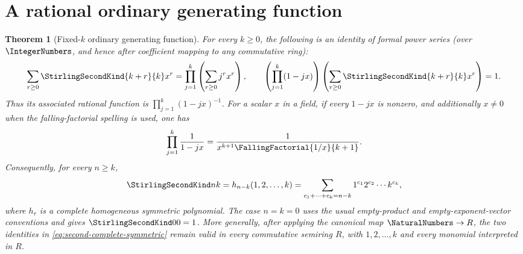 \documentclass[11pt,a4paper,oneside,openany]{book}
\newtheorem{theorem}{Theorem}[chapter]
\theoremstyle{definition}
\theoremstyle{remark}
\begin{document}
\section{A rational ordinary generating function}
\begin{theorem}[Fixed-$k$ ordinary generating function]\label{thm:second-ogf}
For every $k\ge0$, the following is an identity of formal power series (over
$\IntegerNumbers$, and hence after coefficient mapping to any commutative
ring):
\begin{equation}\label{eq:second-ogf}
 \sum_{r\ge0}\StirlingSecondKind{k+r}{k}x^r
 =\prod_{j=1}^k\left(\sum_{r\ge0}j^r x^r\right),
 \qquad
 \left(\prod_{j=1}^k(1-jx)\right)
 \left(\sum_{r\ge0}\StirlingSecondKind{k+r}{k}x^r\right)=1.
\end{equation}
Thus its associated rational function is $\prod_{j=1}^k(1-jx)^{-1}$.
For a scalar $x$ in a field, if every $1-jx$ is nonzero, and additionally
$x\ne0$ when the falling-factorial spelling is used, one has
\[
 \prod_{j=1}^k\frac1{1-jx}
 =\frac1{x^{k+1}\FallingFactorial{1/x}{k+1}}.
\]
Consequently, for every $n\ge k$,
\begin{equation}\label{eq:second-complete-symmetric}
 \StirlingSecondKind nk=h_{n-k}(1,2,\ldots,k)
 =\sum_{c_1+\cdots+c_k=n-k}1^{c_1}2^{c_2}\cdots k^{c_k},
\end{equation}
where $h_r$ is a complete homogeneous symmetric polynomial.  The case
$n=k=0$ uses the usual empty-product and empty-exponent-vector conventions
and gives $\StirlingSecondKind00=1$.  More generally, after applying the
canonical map $\NaturalNumbers\to R$, the two identities in
\cref{eq:second-complete-symmetric} remain valid in every commutative semiring
$R$, with $1,2,\ldots,k$ and every monomial interpreted in $R$.
\end{theorem}
\end{document}
